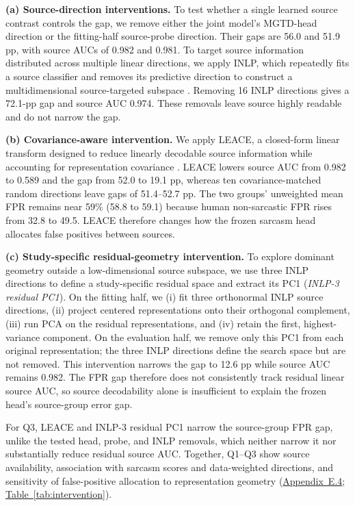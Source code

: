 \documentclass[11pt]{article}
\newcommand{\Tabref}[1]{\hyperref[#1]{Table~\ref*{#1}}}
\begin{document}
\noindent\textbf{(a) Source-direction interventions.} To test whether a single learned source contrast controls the gap, we remove either the joint model's MGTD-head direction or the fitting-half source-probe direction. Their gaps are 56.0 and 51.9 pp, with source AUCs of 0.982 and 0.981. To target source information distributed across multiple linear directions, we apply INLP, which repeatedly fits a source classifier and removes its predictive direction to construct a multidimensional source-targeted subspace \citep{ravfogel2020inlp}. Removing 16 INLP directions gives a 72.1-pp gap and source AUC 0.974. These removals leave source highly readable and do not narrow the gap.

\noindent\textbf{(b) Covariance-aware intervention.} We apply LEACE, a closed-form linear transform designed to reduce linearly decodable source information while accounting for representation covariance \citep{belrose2023leace}. LEACE lowers source AUC from 0.982 to 0.589 and the gap from 52.0 to 19.1 pp, whereas ten covariance-matched random directions leave gaps of 51.4--52.7 pp. The two groups' unweighted mean FPR remains near 59\% (58.8 to 59.1) because human non-sarcastic FPR rises from 32.8 to 49.5. LEACE therefore changes how the frozen sarcasm head allocates false positives between sources.

\noindent\textbf{(c) Study-specific residual-geometry intervention.} To explore dominant geometry outside a low-dimensional source subspace, we use three INLP directions to define a study-specific residual space and extract its PC1 (\emph{INLP-3 residual PC1}). On the fitting half, we (i) fit three orthonormal INLP source directions, (ii) project centered representations onto their orthogonal complement, (iii) run PCA on the residual representations, and (iv) retain the first, highest-variance component. On the evaluation half, we remove only this PC1 from each original representation; the three INLP directions define the search space but are not removed. This intervention narrows the gap to 12.6 pp while source AUC remains 0.982. The FPR gap therefore does not consistently track residual linear source AUC, so source decodability alone is insufficient to explain the frozen head's source-group error gap.

For Q3, LEACE and INLP-3 residual PC1 narrow the source-group FPR gap, unlike the tested head, probe, and INLP removals, which neither narrow it nor substantially reduce residual source AUC. Together, Q1--Q3 show source availability, association with sarcasm scores and data-weighted directions, and sensitivity of false-positive allocation to representation geometry (\hyperref[app:repr-evidence]{Appendix~E.4}; \Tabref{tab:intervention}).
\end{document}
